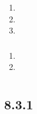 \subsubsection{}\label{section-32}

\begin{enumerate}
\def\labelenumi{\arabic{enumi}.}
\tightlist
\item
\item
\item
\end{enumerate}

\subsubsection{}\label{section-33}

\begin{enumerate}
\def\labelenumi{\arabic{enumi}.}
\tightlist
\item
\item
\end{enumerate}

\subsection{}\label{section-34}

\section{}\label{section-35}

\subsection{}\label{section-36}

\subsection{8.3.1}\label{section-37}

\subsubsection{}\label{section-38}

